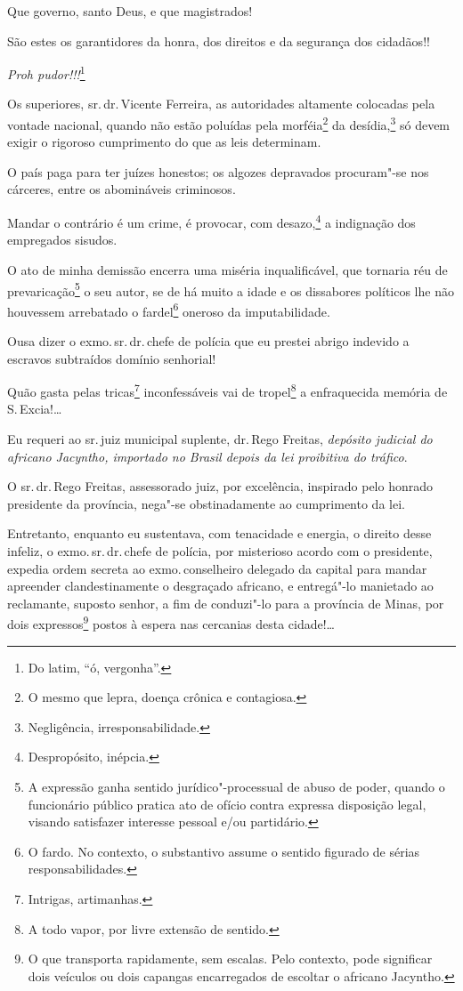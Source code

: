 Que governo, santo Deus, e que magistrados!

São estes os garantidores da honra, dos direitos e da segurança dos
cidadãos!!

\emph{Proh pudor!!!}\footnote{Do latim, ``ó, vergonha''.}

Os superiores, sr.\,dr.\,Vicente Ferreira, as autoridades altamente
colocadas pela vontade nacional, quando não estão poluídas pela
morféia\footnote{O mesmo que lepra, doença crônica e contagiosa.} da
desídia,\footnote{Negligência, irresponsabilidade.} só devem exigir o
rigoroso cumprimento do que as leis determinam.

O país paga para ter juízes honestos; os algozes depravados procuram"-se
nos cárceres, entre os abomináveis criminosos.

Mandar o contrário é um crime, é provocar, com desazo,\footnote{
  Despropósito, inépcia.} a indignação dos empregados sisudos.

O ato de minha demissão encerra uma miséria inqualificável, que tornaria
réu de prevaricação\footnote{A expressão ganha sentido
  jurídico"-processual de abuso de poder, quando o funcionário público
  pratica ato de ofício contra expressa disposição legal, visando
  satisfazer interesse pessoal e/ou partidário.} o seu autor, se de há
muito a idade e os dissabores políticos lhe não houvessem arrebatado o
fardel\footnote{O fardo. No contexto, o substantivo assume o
  sentido figurado de sérias responsabilidades.} oneroso da
imputabilidade.

Ousa dizer o exmo.\,sr.\,dr.\,chefe de polícia que eu prestei abrigo
indevido a escravos subtraídos domínio senhorial!

Quão gasta pelas tricas\footnote{Intrigas, artimanhas.} inconfessáveis
vai de tropel\footnote{A todo vapor, por livre extensão de sentido.} a
enfraquecida memória de S.\,Excia!\ldots{}

Eu requeri ao sr.\,juiz municipal suplente, dr.\,Rego Freitas,
\emph{depósito judicial do africano Jacyntho, importado no Brasil depois
da lei proibitiva do tráfico}.

O sr.\,dr.\,Rego Freitas, assessorado juiz, por excelência, inspirado pelo
honrado presidente da província, nega"-se obstinadamente ao cumprimento
da lei.

Entretanto, enquanto eu sustentava, com tenacidade e energia, o direito
desse infeliz, o exmo.\,sr.\,dr.\,chefe de polícia, por misterioso acordo
com o presidente, expedia ordem secreta ao exmo.\,conselheiro delegado da
capital para mandar apreender clandestinamente o desgraçado africano, e
entregá"-lo manietado ao reclamante, suposto senhor, a fim de conduzi"-lo
para a província de Minas, por dois expressos\footnote{O que
  transporta rapidamente, sem escalas. Pelo contexto, pode significar
  dois veículos ou dois capangas encarregados de escoltar o africano
  Jacyntho.} postos à espera nas cercanias desta cidade!\ldots{}


